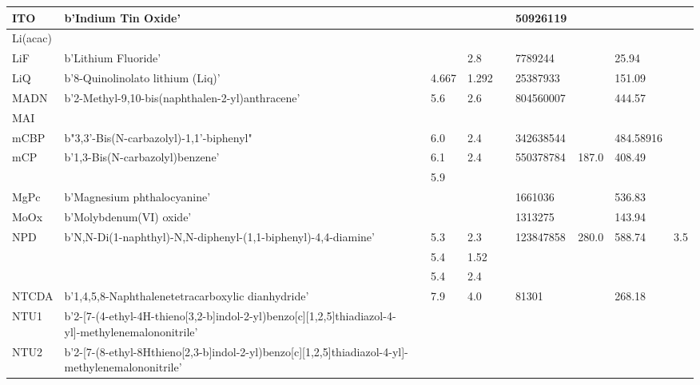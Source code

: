 \documentclass[../thesis.tex]{subfiles}
\begin{document}
\begin{landscape}
\begin{longtable}{| p{} | p{} | p{} | p{} | p{} | p{} | p{} | p{} | p{} | p{} | }
 \hline 
ITO & b'Indium Tin Oxide' &  &  &  &  & 50926119 &  &  &  \\ 
 
 \hline 
Li(acac) &  &  &  &  &  &  &  &  &  \\ 
 
 \hline 
LiF & b'Lithium Fluoride' &  &  & 2.8 &  & 7789244 &  & 25.94 &  \\ 
 
 \hline 
LiQ & b'8-Quinolinolato lithium (Liq)' &  & 4.667 & 1.292 &  & 25387933 &  & 151.09 &  \\ 
 
 \hline 
MADN & b'2-Methyl-9,10-bis(naphthalen-2-yl)anthracene' &  & 5.6 & 2.6 &  & 804560007 &  & 444.57 &  \\ 
 
 \hline 
MAI &  &  &  &  &  &  &  &  &  \\ 
 
 \hline 
mCBP & b"3,3'-Bis(N-carbazolyl)-1,1'-biphenyl" &  & 6.0 & 2.4 &  & 342638544 &  & 484.58916 &  \\ 
 
 \hline 
mCP & b'1,3-Bis(N-carbazolyl)benzene' &  & 6.1 & 2.4 &  & 550378784 & 187.0 & 408.49 &  \\ 
 & &  & 5.9 &  &  &  & & & \\ 
 
 \hline 
MgPc & b'Magnesium phthalocyanine' &  &  &  &  & 1661036 &  & 536.83 &  \\ 
 
 \hline 
MoOx & b'Molybdenum(VI) oxide' &  &  &  &  & 1313275 &  & 143.94 &  \\ 
 
 \hline 
NPD & b'N,N-Di(1-naphthyl)-N,N-diphenyl-(1,1-biphenyl)-4,4-diamine' &  & 5.3 & 2.3 &  & 123847858 & 280.0 & 588.74 & 3.5 \\ 
 & &  & 5.4 & 1.52 &  &  & & & \\ 
 & &  & 5.4 & 2.4 &  &  & & & \\ 
 
 \hline 
NTCDA & b'1,4,5,8-Naphthalenetetracarboxylic dianhydride' &  & 7.9 & 4.0 &  & 81301 &  & 268.18 &  \\ 
 
 \hline 
NTU1 & b'2-{[7-(4-ethyl-4H-thieno[3,2-b]indol-2-yl)benzo[c][1,2,5]thiadiazol-4-yl]-methylene}malononitrile' &  &  &  &  &  &  &  &  \\ 
 
 \hline 
NTU2 & b'2-{[7-(8-ethyl-8Hthieno[2,3-b]indol-2-yl)benzo[c][1,2,5]thiadiazol-4-yl]-methylene}malononitrile' &  &  &  &  &  &  &  &  \\ 
 

\end{longtable}
\end{landscape}
\end{document}
